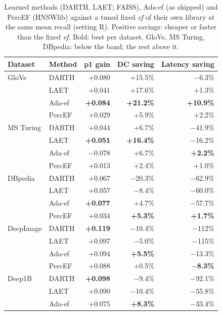 \documentclass[sigconf,review=false,screen]{acmart}
\newcommand{\ef}{\textit{ef}}
\begin{document}
\begin{table}[t]
  \caption{Learned methods (DARTH, LAET; FAISS), Ada-ef (as shipped) and PercEF (HNSWlib) against a
  tuned fixed \ef{} of their own library at the same mean recall (setting R). Positive savings:
  cheaper or faster than the fixed \ef{}. Bold: best per dataset. GloVe, MS Turing, DBpedia: below
  the band; the rest above it.}
  \label{tab:darth}
  \centering\footnotesize
  \begin{tabular}{llrrr}
    \toprule
    Dataset & Method & p1 gain & DC saving & Latency saving \\
    \midrule
    GloVe         & DARTH  & +0.080 & +15.5\% & $-$6.3\% \\
                  & LAET   & +0.041 & +17.6\% & +1.3\% \\
                  & Ada-ef & \textbf{+0.084} & \textbf{+21.2\%} & \textbf{+10.9\%} \\
                  & PercEF & +0.029 & +5.9\% & +2.2\% \\
    \midrule
    MS Turing     & DARTH  & +0.044 & +6.7\% & $-$41.9\% \\
                  & LAET   & \textbf{+0.051} & \textbf{+16.4\%} & $-$16.2\% \\
                  & Ada-ef & $-$0.078 & +6.7\% & \textbf{+2.2\%} \\
                  & PercEF & +0.013 & +2.4\% & +1.0\% \\
    \midrule
    DBpedia       & DARTH  & +0.067 & $-$20.3\% & $-$62.9\% \\
                  & LAET   & +0.057 & $-$8.4\% & $-$60.0\% \\
                  & Ada-ef & \textbf{+0.077} & +4.7\% & $-$57.7\% \\
                  & PercEF & +0.034 & \textbf{+5.3\%} & \textbf{+1.7\%} \\
    \midrule
    DeepImage     & DARTH  & \textbf{+0.119} & $-$10.4\% & $-$112\% \\
                  & LAET   & +0.097 & $-$5.0\% & $-$115\% \\
                  & Ada-ef & +0.094 & \textbf{+5.5\%} & $-$13.3\% \\
                  & PercEF & +0.088 & +0.5\% & \textbf{$-$8.3\%} \\
    \midrule
    Deep1B        & DARTH  & \textbf{+0.098} & $-$9.4\% & $-$92.1\% \\
                  & LAET   & +0.090 & $-$10.4\% & $-$55.8\% \\
                  & Ada-ef & +0.075 & \textbf{+8.3\%} & $-$33.4\% \\

\end{tabular}
\end{table}
\end{document}
